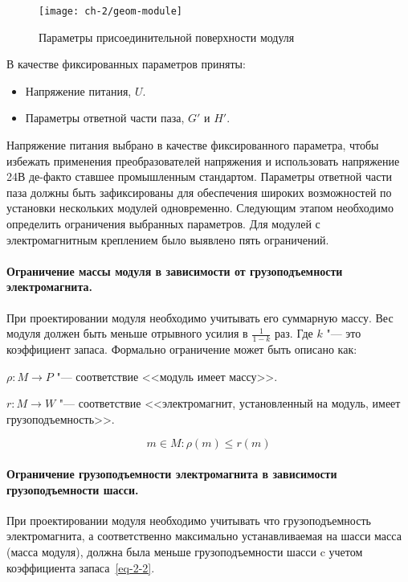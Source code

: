 \begin{figure}[tbh]
	\centering
	\texttt{[image: ch-2/geom-module]}
	\caption{Параметры присоединительной поверхности модуля}
	\label{fig:geom-module}
\end{figure}

В качестве фиксированных параметров приняты:

\begin{itemize}
	\item Напряжение питания, $U$.
	\item Параметры ответной части паза, $G'$ и $H'$.
\end{itemize}

Напряжение питания выбрано в качестве фиксированного параметра, чтобы избежать применения преобразователей напряжения и использовать напряжение 24\:В де-факто ставшее промышленным стандартом. Параметры ответной части паза должны быть зафиксированы для обеспечения  широких возможностей по установки нескольких модулей одновременно. Следующим этапом необходимо определить ограничения выбранных параметров. Для модулей с электромагнитным креплением было выявлено пять ограничений.

\paragraph{Ограничение массы модуля в зависимости от грузоподъемности электромагнита.} При проектировании модуля необходимо учитывать его суммарную массу. Вес модуля должен быть меньше отрывного усилия в $\frac{1}{1-k}$ раз. Где $k$ "--- это коэффициент запаса. Формально ограничение может быть описано как:

\noindent $\rho : M \rightarrow P$ "--- соответствие <<модуль имеет массу>>.

\noindent $r : M \rightarrow W$ "--- соответствие <<электромагнит, установленный на модуль, имеет грузоподъемность>>.

\begin{equation}
m \in M: \rho(m) \leq r(m)
\end{equation}

\paragraph{Ограничение грузоподъемности электромагнита в зависимости грузоподъемности шасси.} При проектировании модуля необходимо учитывать что грузоподъемность электромагнита, а соответственно максимально устанавливаемая на шасси масса (масса модуля), должна была меньше грузоподъемности шасси c учетом коэффициента запаса~\cref{eq-2-2}.

